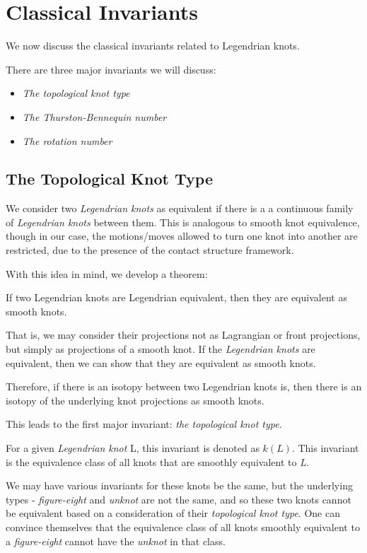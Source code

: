 \documentclass{article}
\begin{document}
\section{Classical Invariants}
We now discuss the classical invariants related to Legendrian knots.

There are three major invariants we will discuss:
\begin{itemize}
    \item \textit{The topological knot type}
    \item \textit{The Thurston-Bennequin number}
    \item \textit{The rotation number}
\end{itemize}

\subsection{The Topological Knot Type}
We consider two \textit{Legendrian knots} as equivalent
if there is a a continuous family of \textit{Legendrian knots} between
them. This is analogous to smooth knot equivalence, though in our case,
the motions/moves allowed to turn one knot into another are restricted,
due to the presence of the contact structure framework.

With this idea in mind, we develop a theorem:
\begin{theorem}
    If two Legendrian knots are Legendrian equivalent, then they are
    equivalent as smooth knots.
\end{theorem}

That is, we may consider their projections not as Lagrangian or front
projections, but simply as projections of a smooth knot. If the \textit{Legendrian knots}
are equivalent, then we can show that they are equivalent as smooth knots.

Therefore, if there is an 
isotopy between two Legendrian knots is, then there is an isotopy of the underlying knot
projections as smooth knots.

This leads to the first major invariant: \textit{the topological knot type}.

For a given \textit{Legendrian knot} L, this invariant is denoted as $k(L)$.
This invariant is the equivalence class of all knots that are smoothly equivalent
to \textit{L}.

We may have various invariants for these
knots be the same, but the underlying types - \textit{figure-eight} and \textit{unknot}
are not the same, and so these two knots cannot be equivalent based on a consideration
of their \textit{topological knot type}. One can convince themselves that
the equivalence class of all knots smoothly equivalent to a \textit{figure-eight}
cannot have the \textit{unknot} in that class.
\end{document}

